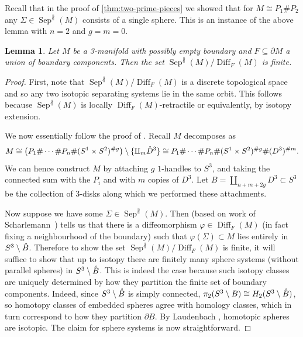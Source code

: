 \documentclass{amsart}
\theoremstyle{plain}
\newtheorem{lem}[thm]{Lemma}
\theoremstyle{definition}
\DeclareMathOperator\Diff{Diff}
\newcommand{\interior}[1]{\smash{\mathring{#1}}}
\DeclareMathOperator\sep{Sep} %
\newcommand{\sepNP}{\sep^{\nparallel}} %
\begin{document}
Recall that in the proof of \cref{thm:two-prime-pieces} we showed that for $M\cong P_1 \# P_2$ any $\Sigma \in \sepNP(M)$ consists of a single sphere. This is an instance of the above lemma with $n=2$ and $g=m=0$.


\begin{lem}\label{lem:finitely-many-graphs-HM}
    Let $M$ be a 3-manifold with possibly empty boundary and $F \subseteq \partial M$ a union of boundary components. 
    Then the set $\sepNP(M)/\Diff_F(M)$ is finite.
\end{lem}
\begin{proof}
    First, note that $\sepNP(M)/\Diff_F(M)$ is a discrete topological space and so any two isotopic separating systems lie in the same orbit.
    This follows because $\sepNP(M)$ is locally $\Diff_F(M)$-retractile or equivalently, by isotopy extension.

    We now essentially follow the proof of \cite[Lemma 2.1]{HatcherMcCullough1990}.
    Recall $M$ decomposes as
    \[
        M\cong \left(P_1\#\cdots \#P_n \# (S^1\times S^2)^{\# g}\right)\setminus \{\amalg_m \interior{D}^3\}
        \cong P_1\#\cdots \#P_n \# (S^1\times S^2)^{\# g} \# (D^3)^{\# m}.
    \]
    We can hence construct $M$ by attaching $g$ $1$-handles to $S^3$, and taking the connected sum with the $P_i$ and with $m$ copies of $D^3$.
    Let $B = \amalg_{n+m+2g} D^3 \subset S^3$ be the collection of $3$-disks along which we performed these attachments.

    Now suppose we have some $\Sigma \in \sepNP(M)$. 
    Then \cite[Lemma 2.1]{HatcherMcCullough1990} (based on work of Scharlemann~\cite[Appendix A]{Bonahon-Cobordism}) tells us that there is a diffeomorphism $\varphi \in \Diff_F(M)$ (in fact fixing a neighbourhood of the boundary) such that $\varphi(\Sigma) \subset M$ lies entirely in $S^3\setminus \interior{B}$.
    Therefore to show the set $\sepNP(M)/\Diff_F(M)$ is finite, it will suffice to show that up to isotopy there are finitely many sphere systems (without parallel spheres) in $S^3\setminus \interior{B}$.
    This is indeed the case because such isotopy classes are uniquely determined by how they partition the finite set of boundary components. Indeed, since $S^3\setminus \interior{B}$ is simply connected, $\pi_2(S^3\setminus B)\cong H_2(S^3\setminus \interior{B})$, so homotopy classes of embedded spheres agree with homology classes, which in turn correspond to how they partition $\partial B$.  By Laudenbach \cite{Laudenbach73}, homotopic spheres are isotopic. The claim for sphere systems is now straightforward.
\end{proof}
\end{document}
